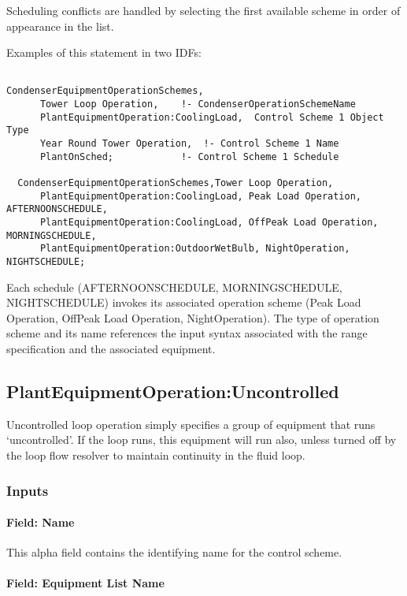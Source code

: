 Scheduling conflicts are handled by selecting the first available scheme in order of appearance in the list.

Examples of this statement in two IDFs:

\begin{lstlisting}

CondenserEquipmentOperationSchemes,
      Tower Loop Operation,    !- CondenserOperationSchemeName
      PlantEquipmentOperation:CoolingLoad,  Control Scheme 1 Object Type
      Year Round Tower Operation,  !- Control Scheme 1 Name
      PlantOnSched;            !- Control Scheme 1 Schedule

  CondenserEquipmentOperationSchemes,Tower Loop Operation,
      PlantEquipmentOperation:CoolingLoad, Peak Load Operation, AFTERNOONSCHEDULE,
      PlantEquipmentOperation:CoolingLoad, OffPeak Load Operation, MORNINGSCHEDULE,
      PlantEquipmentOperation:OutdoorWetBulb, NightOperation, NIGHTSCHEDULE;
\end{lstlisting}

Each schedule (AFTERNOONSCHEDULE, MORNINGSCHEDULE, NIGHTSCHEDULE) invokes its associated operation scheme (Peak Load Operation, OffPeak Load Operation, NightOperation). The type of operation scheme and its name references the input syntax associated with the range specification and the associated equipment.

\subsection{PlantEquipmentOperation:Uncontrolled}\label{plantequipmentoperationuncontrolled}

Uncontrolled loop operation simply specifies a group of equipment that runs `uncontrolled'. If the loop runs, this equipment will run also, unless turned off by the loop flow resolver to maintain continuity in the fluid loop.

\subsubsection{Inputs}\label{inputs-2-028}

\paragraph{Field: Name}\label{field-name-2-027}

This alpha field contains the identifying name for the control scheme.

\paragraph{Field: Equipment List Name}\label{field-equipment-list-name}

